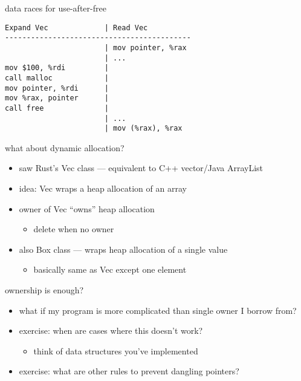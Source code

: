 \begin{frame}[fragile,label=raceUAF]{data races for use-after-free}
\begin{Verbatim}
Expand Vec             | Read Vec
-------------------------------------------
                       | mov pointer, %rax
                       | ...
mov $100, %rdi         |
call malloc            |
mov pointer, %rdi      |
mov %rax, pointer      |
call free              |
                       | ...
                       | mov (%rax), %rax
\end{Verbatim}
\end{frame}

\begin{frame}{what about dynamic allocation?}
    \begin{itemize}
    \item saw Rust's Vec class --- equivalent to C++ vector/Java ArrayList
    \item idea: Vec wraps a heap allocation of an array
    \item owner of Vec ``owns'' heap allocation
        \begin{itemize}
        \item delete when no owner
        \end{itemize}
    \item also Box class --- wraps heap allocation of a single value
        \begin{itemize}
        \item basically same as Vec except one element
        \end{itemize}
    \end{itemize}
\end{frame}


\begin{frame}{ownership is enough?}
    \begin{itemize}
    \item what if my program is more complicated than single owner I borrow from?
    \vspace{.5cm}
    \item exercise: when are cases where this doesn't work?
        \begin{itemize}
        \item think of data structures you've implemented
        \end{itemize}
    \item exercise: what are other rules to prevent dangling pointers?
    \end{itemize}
\end{frame}

